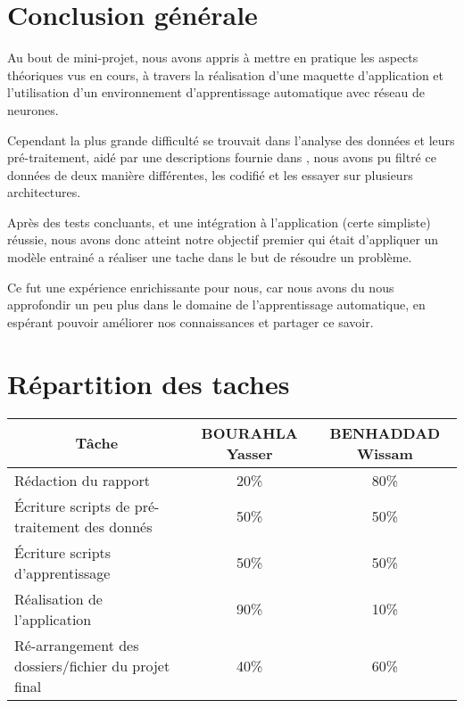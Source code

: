 \section{Conclusion générale}
Au bout de mini-projet, nous avons appris à mettre en pratique les aspects théoriques vus en cours, à travers la réalisation d'une maquette d'application et l'utilisation d'un environnement d'apprentissage automatique avec réseau de neurones.
\par 
Cependant la plus grande difficulté se trouvait dans l'analyse des données et leurs pré-traitement, aidé par une descriptions fournie dans \cite{datasetDetails}, nous avons pu filtré ce données de deux manière différentes, les codifié et les essayer sur plusieurs architectures.\par
Après des tests concluants, et une intégration à l'application (certe simpliste)  réussie, nous avons donc atteint notre objectif premier qui était d'appliquer un modèle entrainé a réaliser une tache dans le but de résoudre un problème.\par 
Ce fut une expérience enrichissante pour nous, car nous avons du nous approfondir un peu plus  dans le domaine de l'apprentissage automatique, en espérant pouvoir améliorer nos connaissances et partager ce savoir.

\section{Répartition des taches}

\begin{table}[H]
	\centering
	\begin{tabular}{|l|c|c|}
		\hline
		\multicolumn{1}{|c|}{Tâche}                      & BOURAHLA Yasser & BENHADDAD Wissam \\ \hline
		Rédaction du rapport                             & 20\%            & 80\%             \\ \hline
		Écriture scripts de pré-traitement des donnés         & 50\%            & 50\%             \\ \hline
		Écriture scripts d'apprentissage    & 50\%            & 50\%             \\ \hline
		Réalisation de l'application                     & 90\%            & 10\%             \\ \hline
		Ré-arrangement des dossiers/fichier du projet final & 40\%            & 60\%             \\ \hline
	\end{tabular}
\end{table}